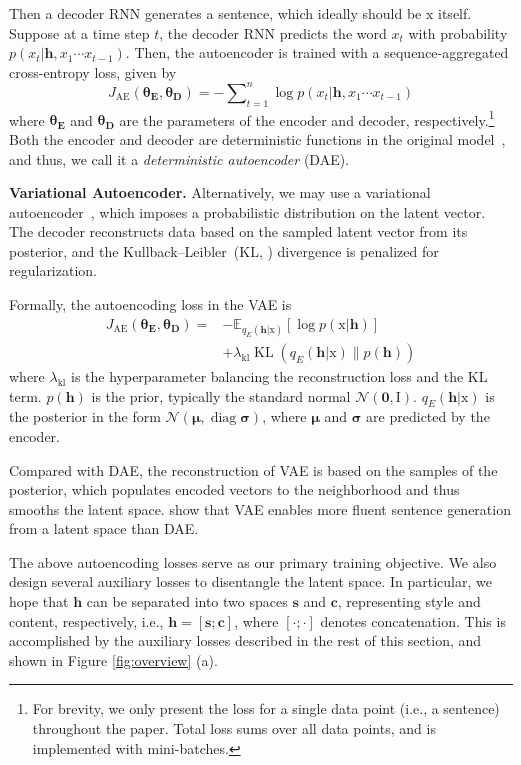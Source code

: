 \documentclass[11pt,a4paper]{article}
\newcommand{\rmx}{\mathrm x}
\newcommand{\loss}[1]{J_{\text{#1}}}
\newcommand{\hyp}[1]{\lambda_{\text{#1}}}
\newcommand{\nnweight}[1]{\bm{\theta_{\text{#1}}}}
\begin{document}
Then a decoder RNN generates a sentence, which ideally should be $\rmx$ itself.
Suppose at a time step $t$, the decoder RNN predicts the word $x_t$ with probability $p(x_t|\bm h, x_1\cdots x_{t-1})$. Then, the autoencoder is trained with a sequence-aggregated cross-entropy loss, given by
\begin{equation}\nonumber
	\loss{AE}(\nnweight{E},\nnweight{D})= -\sum\nolimits_{t=1}^n \log p(x_t|\bm h, x_1\cdots x_{t-1})
\end{equation}
where $\nnweight{E}$ and $\nnweight{D}$ are the parameters of the encoder and decoder, respectively.\footnote{For brevity, we only present the loss for a single data point (i.e., a sentence) throughout the paper. Total loss sums over all data points, and is implemented with mini-batches.} Both the encoder and decoder are deterministic functions in the original model~\cite{rumelhart1985learning}, and thus, we call it a \textit{deterministic autoencoder} (DAE).


\textbf{Variational Autoencoder.} Alternatively, we may use a variational autoencoder~\cite[VAE,][]{kingma2013auto}, which imposes a probabilistic distribution on the latent vector. The decoder reconstructs data based on the sampled latent vector from its posterior, and the Kullback--Leibler~(KL, \citeyear{kullback1951information}) divergence  is penalized for regularization.

Formally, the autoencoding loss in the VAE is
\begin{align}
	\loss{AE}(\nnweight{E}, \nnweight{D}) = & - \mathbb{E}_{q_{E}(\bm h|\rmx)} [\log p(\rmx|\bm h)]  \nonumber \\ \nonumber
	                                        & + \hyp{kl}\operatorname{KL}(q_{E}(\bm h|\rmx)\|p(\bm h))
\end{align}
where $\hyp{kl}$ is the hyperparameter balancing the reconstruction loss and the KL term. $p(\bm h)$ is the prior, typically the standard normal  $\mathcal{N}(\bm 0,\mathrm I)$. $q_E(\bm h|\mathrm x)$ is the posterior in the form $\mathcal{N}(\bm \mu,\operatorname{diag} \bm\sigma)$, where $\bm\mu$ and $\bm\sigma$ are predicted by the encoder.

Compared with DAE, the reconstruction of VAE  is based on the samples of the posterior, which populates encoded vectors to the neighborhood and thus smooths the latent space.
\citet{bowman2016generating} show that VAE enables more fluent sentence generation from a latent space than DAE.

The above autoencoding losses serve as our primary training objective.
We also design several auxiliary losses to disentangle the latent space. In particular, we hope that $\bm h$ can be separated into two spaces $\bm s$ and $\bm c$, representing style and content, respectively, i.e., $\bm h = [\bm s ; \bm c]$, where $[\cdot;\cdot]$ denotes concatenation.
This is accomplished by the auxiliary losses described in the rest of this section, and shown in Figure \ref{fig:overview} (a).
\end{document}
